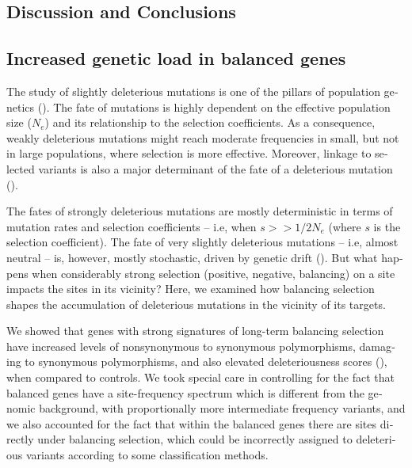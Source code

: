 \begin{refsection}
\begin{otherlanguage}{english}

\section{Discussion and Conclusions}   %

\subsection{Increased genetic load in balanced genes}

The study of slightly deleterious mutations is one of the pillars of population genetics (\cite{Kondrashov1995}). The fate of mutations is highly dependent on   the effective population size ($N_{e}$) and its relationship to the selection coefficients. As a consequence, weakly deleterious mutations might  reach moderate frequencies in small, but not in large populations, where selection is more effective. Moreover, linkage to selected variants is also a major determinant of the fate of a deleterious mutation (\cite{Hill1966,Cutter2013}).

The fates of strongly deleterious mutations are mostly deterministic in terms of mutation rates and selection coefficients -- i.e, when $s>>1/2N_{e}$ (where $s$ is the selection coefficient). The  fate of very slightly deleterious mutations -- i.e, almost neutral -- is, however, mostly stochastic, driven by genetic drift (\cite{Kondrashov1995}). But what happens when considerably strong selection (positive, negative, balancing) on a site impacts the sites in its vicinity? Here, we examined how balancing selection shapes the accumulation of deleterious mutations in the vicinity of its targets. 

We showed that genes with strong signatures of long-term balancing selection have increased levels of nonsynonymous to synonymous polymorphisms, damaging to synonymous polymorphisms, and also elevated deleteriousness scores (\cite{Kircher2014}), when compared to controls. We took special care in controlling for the fact that balanced genes have a site-frequency spectrum which is different from the genomic background, with proportionally more intermediate frequency variants, and we also accounted for the fact that within the balanced genes there are sites directly under balancing selection, which could be incorrectly assigned to deleterious variants according to some classification methods.


\end{otherlanguage}
\end{refsection}
